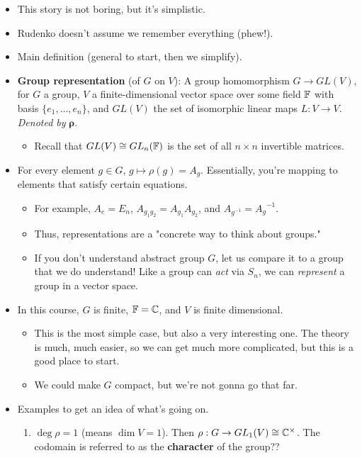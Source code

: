 \documentclass[../notes.tex]{subfiles}
\begin{document}
\begin{itemize}
\begin{itemize}
    \end{itemize}
    \item This story is not boring, but it's simplistic.
    \item Rudenko doesn't assume we remember everything (phew!).
    \item Main definition (general to start, then we simplify).
    \item \textbf{Group representation} (of $G$ on $V$): A group homomorphism $G\to GL(V)$, for $G$ a group, $V$ a finite-dimensional vector space over some field $\mathbb{F}$ with basis $\{e_1,\dots,e_n\}$, and $GL(V)$ the set of isomorphic linear maps $L:V\to V$. \emph{Denoted by} $\bm{\rho}$.
    \begin{itemize}
        \item Recall that $GL(V)\cong GL_n(\mathbb{F})$ is the set of all $n\times n$ invertible matrices.
    \end{itemize}
    \item For every element $g\in G$, $g\mapsto\rho(g)=A_g$. Essentially, you're mapping to elements that satisfy certain equations.
    \begin{itemize}
        \item For example, $A_e=E_n$, $A_{g_1g_2}=A_{g_1}A_{g_2}$, and $A_{g^{-1}}={A_g}^{-1}$.
        \item Thus, representations are a "concrete way to think about groups."
        \item If you don't understand abstract group $G$, let us compare it to a group that we do understand! Like a group can \emph{act} via $S_n$, we can \emph{represent} a group in a vector space.
    \end{itemize}
    \item In this course, $G$ is finite, $\mathbb{F}=\mathbb{C}$, and $V$ is finite dimensional.
    \begin{itemize}
        \item This is the most simple case, but also a very interesting one. The theory is much, much easier, so we can get much more complicated, but this is a good place to start.
        \item We could make $G$ compact, but we're not gonna go that far.
    \end{itemize}
    \item Examples to get an idea of what's going on.
    \begin{enumerate}
        \item $\deg\rho=1$ (means $\dim V=1$). Then $\rho:G\to GL_1(V)\cong\mathbb{C}^\times$. The codomain is referred to as the \textbf{character} of the group??

\end{enumerate}
\end{itemize}
\end{document}
